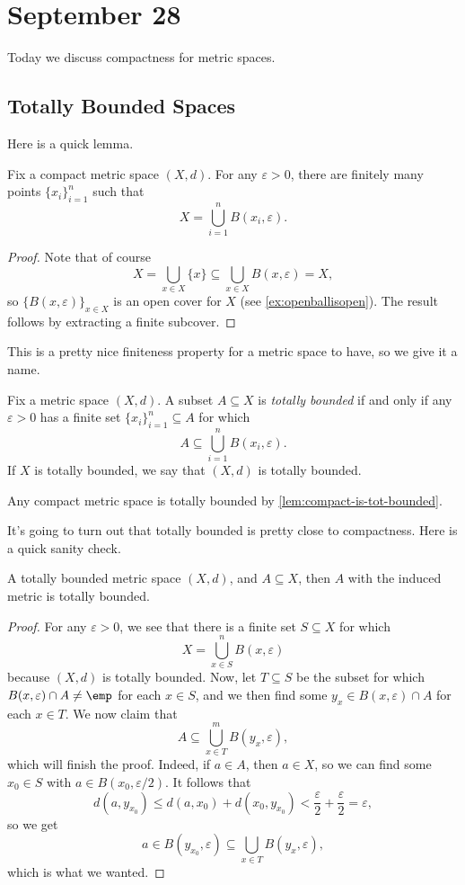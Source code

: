 \documentclass[../notes.tex]{subfiles}
\begin{document}
\section{September 28}

Today we discuss compactness for metric spaces.

\subsection{Totally Bounded Spaces}
Here is a quick lemma.
\begin{lemma} \label{lem:compact-is-tot-bounded}
	Fix a compact metric space $(X,d)$. For any $\varepsilon>0$, there are finitely many points $\{x_i\}_{i=1}^n$ such that
	\[X=\bigcup_{i=1}^nB(x_i,\varepsilon).\]
\end{lemma}
\begin{proof}
	Note that of course
	\[X=\bigcup_{x\in X}\{x\}\subseteq\bigcup_{x\in X}B(x,\varepsilon)=X,\]
	so $\{B(x,\varepsilon)\}_{x\in X}$ is an open cover for $X$ (see \autoref{ex:openballisopen}). The result follows by extracting a finite subcover.
\end{proof}
This is a pretty nice finiteness property for a metric space to have, so we give it a name.
\begin{definition}
	Fix a metric space $(X,d)$. A subset $A\subseteq X$ is \textit{totally bounded} if and only if any $\varepsilon>0$ has a finite set $\{x_i\}_{i=1}^n\subseteq A$ for which
	\[A\subseteq\bigcup_{i=1}^nB(x_i,\varepsilon).\]
	If $X$ is totally bounded, we say that $(X,d)$ is totally bounded.
\end{definition}
\begin{example}
	Any compact metric space is totally bounded by \autoref{lem:compact-is-tot-bounded}.
\end{example}
It's going to turn out that totally bounded is pretty close to compactness. Here is a quick sanity check.
\begin{lemma}
	A totally bounded metric space $(X,d)$, and $A\subseteq X$, then $A$ with the induced metric is totally bounded.
\end{lemma}
\begin{proof}
	For any $\varepsilon>0$, we see that there is a finite set $S\subseteq X$ for which
	\[X=\bigcup_{x\in S}^nB(x,\varepsilon)\]
	because $(X,d)$ is totally bounded. Now, let $T\subseteq S$ be the subset for which $B(x,\varepsilon)\cap A\ne\emp$ for each $x\in S$, and we then find some $y_x\in B(x,\varepsilon)\cap A$ for each $x\in T$. We now claim that
	\[A\subseteq\bigcup_{x\in T}^mB(y_x,\varepsilon),\]
	which will finish the proof. Indeed, if $a\in A$, then $a\in X$, so we can find some $x_0\in S$ with $a\in B(x_0,\varepsilon/2)$. It follows that
	\[d(a,y_{x_0})\le d(a,x_0)+d(x_0,y_{x_0})<\frac\varepsilon2+\frac\varepsilon2=\varepsilon,\]
	so we get
	\[a\in B(y_{x_0},\varepsilon)\subseteq\bigcup_{x\in T}B(y_x,\varepsilon),\]
	which is what we wanted.
\end{proof}
\end{document}
